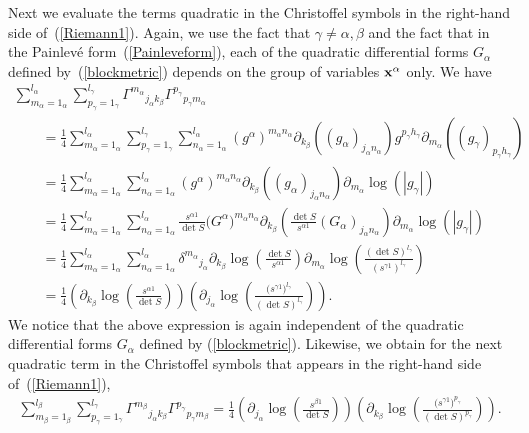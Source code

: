 \documentclass[11pt]{article}
\numberwithin{equation}{section}
\newcommand{\jalpha}{j_{\alpha}}
\newcommand{\kbeta}{k_{\beta}}
\newcommand{\pgamma}{p_{\gamma}}
\newcommand{\malpha}{m_{\alpha}}
\newcommand{\mbeta}{m_{\beta}}
\newcommand{\lbeta}{l_{\beta}}
\newcommand{\lalpha}{l_{\alpha}}
\newcommand{\lgamma}{l_{\gamma}}
\newcommand{\nalpha}{n_{\alpha}}
\newcommand{\hgamma}{h_{\gamma}}
\begin{document}
Next we evaluate the terms quadratic in the Christoffel symbols in the right-hand side of~(\ref{Riemann1}). Again, we use the fact that $\gamma\neq \alpha, \beta$ and the fact that in the Painlev\'e form~(\ref{Painleveform}), each of the quadratic differential forms $G_{\alpha}$ defined by~(\ref{blockmetric}) depends on the group of variables ${\bf x}^{\alpha}$ only. We have
\begin{gather}
\sum_{\malpha=1_{\alpha}}^{\lalpha} \sum_{\pgamma = 1_{\gamma}}^{\lgamma}{\Gamma^{\malpha}}_{\jalpha \kbeta}{\Gamma^{\pgamma}}_{\pgamma \malpha}\nonumber\\
\qquad{} =\frac{1}{4}\sum_{\malpha = 1_{\alpha}}^{l_{\alpha}} \sum_{\pgamma = 1_{\gamma}}^{\lgamma}\sum_{\nalpha=1_{\alpha}}^{l_{\alpha}}(g^{\alpha})^{\malpha \nalpha}\partial_{\kbeta}((g_{\alpha})_{\jalpha \nalpha})g^{\pgamma \hgamma}\partial_{\malpha}((g_{\gamma})_{\pgamma \hgamma})\nonumber\\
\qquad{} =\frac{1}{4}\sum_{\malpha=1_{\alpha}}^{l_{\alpha}}\sum_{\nalpha=1_{\alpha}}^{l_{\alpha}}(g^{\alpha})^{\malpha \nalpha}\partial_{\kbeta}((g_{\alpha})_{\jalpha \nalpha})\partial_{\malpha}\log(|g_{\gamma}|)\nonumber\\
\qquad{} =\frac{1}{4}\sum_{\malpha=1_{\alpha}}^{l_{\alpha}}\sum_{\nalpha=1_{\alpha}}^{l_{\alpha}}\frac{s^{\alpha 1}}{\det S}\big(G^{\alpha}\big)^{\malpha \nalpha}\partial_{\kbeta}\left(\frac{\det S}{s^{\alpha 1}}(G_{\alpha})_{\jalpha \nalpha}\right)\partial_{\malpha}\log(|g_{\gamma}|)\nonumber\\
\qquad{} =\frac{1}{4}\sum_{\malpha=1_{\alpha}}^{l_{\alpha}}\sum_{\nalpha=1_{\alpha}}^{l_{\alpha}}{\delta^{\malpha}}_{\jalpha}\partial_{\kbeta}\log\left(\frac{\det S}{s^{\alpha 1}}\right)\partial_{\malpha}\log \left(\frac{(\det S)^{\lgamma}}{(s^{\gamma 1})^{\lgamma}}\right)\nonumber\\
\qquad{} =\frac{1}{4}\left(\partial_{\kbeta}\log\left(\frac{s^{\alpha 1}}{\det S}\right)\right)\left(\partial_{\jalpha}\log \left(\frac{\big(s^{\gamma 1}\big)^{\lgamma}}{(\det S)^{\lgamma}}\right)\right).\label{quadr1}
\end{gather}
We notice that the above expression is again independent of the quadratic differential forms $G_{\alpha}$ defined by (\ref{blockmetric}). Likewise, we obtain for the next quadratic term in the Christoffel symbols that appears in the right-hand side of~(\ref{Riemann1}),
\begin{gather}\label{quadr2}
\sum_{\mbeta=1_{\beta}}^{\lbeta} \sum_{\pgamma = 1_{\gamma}}^{\lgamma}{\Gamma^{\mbeta}}_{\jalpha \kbeta}{\Gamma^{\pgamma}}_{\pgamma \mbeta}=\frac{1}{4}\left(\partial_{\jalpha}\log\left(\frac{s^{\beta 1}}{\det S}\right)\right)\left(\partial_{\kbeta}\log \left(\frac{\big(s^{\gamma 1}\big)^{\pgamma}}{(\det S)^{\pgamma}}\right)\right).
\end{gather}
\end{document}
